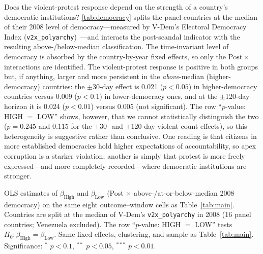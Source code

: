 \documentclass[11pt]{article}
\let\mathbetasym\beta
\renewcommand{\beta}{\ensuremath{\mathbetasym}}
\begin{document}
Does the violent-protest response depend on the strength of a country's democratic institutions? \autoref{tab:democracy} splits the panel countries at the median of their 2008 level of democracy---measured by V-Dem's Electoral Democracy Index (\texttt{v2x\_polyarchy})~\citep{vdem2024}---and interacts the post-scandal indicator with the resulting above-/below-median classification. The time-invariant level of democracy is absorbed by the country-by-year fixed effects, so only the $\mathrm{Post}\times$ interactions are identified. The violent-protest response is positive in both groups but, if anything, larger and more persistent in the \emph{above}-median (higher-democracy) countries: the $\pm$30-day effect is 0.021 ($p<0.05$) in higher-democracy countries versus 0.009 ($p<0.1$) in lower-democracy ones, and at the $\pm$120-day horizon it is 0.024 ($p<0.01$) versus 0.005 (not significant). The row ``$p$-value: HIGH $=$ LOW'' shows, however, that we cannot statistically distinguish the two ($p = 0.245$ and $0.115$ for the $\pm$30- and $\pm$120-day violent-count effects), so this heterogeneity is suggestive rather than conclusive. One reading is that citizens in more established democracies hold higher expectations of accountability, so apex corruption is a starker violation; another is simply that protest is more freely expressed---and more completely recorded---where democratic institutions are stronger.

\begin{table}[htb!]
    \caption{Effect by 2008 level of democracy.}
    \label{tab:democracy}
    \begin{center}
        \scriptsize{}
    \end{center}
    \footnotesize{OLS estimates of $\beta_{\text{High}}$ and $\beta_{\text{Low}}$ (Post $\times$ above-/at-or-below-median 2008 democracy) on the same eight outcome--window cells as Table~\ref{tab:main}. Countries are split at the median of V-Dem's \texttt{v2x\_polyarchy} in 2008 (16 panel countries; Venezuela excluded). The row ``$p$-value: HIGH $=$ LOW'' tests $H_0:\beta_{\text{High}}=\beta_{\text{Low}}$. Same fixed effects, clustering, and sample as Table~\ref{tab:main}. Significance: $^{*}$ $p<0.1$, $^{**}$ $p<0.05$, $^{***}$ $p<0.01$.}
\end{table}

\end{document}
